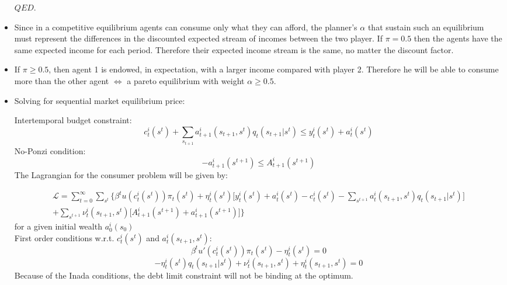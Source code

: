 \documentclass[12pt,a4paper]{article}
\begin{document}
\begin{itemize}
  $QED$.

  \item Since in a competitive equilibrium agents can consume only what they can afford, the planner's $\alpha$ that sustain such an equilibrium must represent the differences in the discounted expected stream of incomes between the two player. If $\pi = 0.5$ then the agents have the same expected income for each period. Therefore their expected income stream is the same, no matter the discount factor.

  \item If $\pi \geq 0.5$, then agent 1 is endowed, in expectation, with a larger income compared with player 2. Therefore he will be able to consume more than the other agent $\Leftrightarrow$ a pareto equilibrium with weight $\alpha \geq 0.5$.

  
 \item Solving for sequential market equilibrium price:
 
Intertemporal budget constraint: 
\begin{equation*}
    c_{t}^{i}(s^t)+\sum_{s_{t+1}}a_{t+1}^{i}(s_{t+1},s^{t})q_t(s_{t+1}|s^{t})\leq y_{t}^{i}(s^t)+a_{t}^{i}(s^t)
\end{equation*}
No-Ponzi condition: 
\begin{equation*}
    -a_{t+1}^{i}(s^{t+1}) \leq A_{t+1}^{i}(s^{t+1})
\end{equation*}
The Lagrangian for the consumer problem will be given by: 


\begin{multline*}
    \mathcal{L}=\sum_{t=0}^{\infty}\sum_{s^t}\bigg\{
    \beta^t u(c_{t}^{i}(s^t))\pi_t(s^t)+\eta_{t}^{i}(s^t)\bigg[y_{t}^{i}(s^t)+a_{t}^{i}(s^t)-c_{t}^{i}(s^t)-\sum_{s^{t+1}}a_{t}^{i}(s_{t+1},s^t)q_t(s_{t+1}|s^{t})\bigg]\\
    +\sum_{s^{t+1}}\nu_{t}^{i}(s_{t+1},s^t)\bigg[A_{t+1}^{i}(s^{t+1})+a_{t+1}^{i}(s^{t+1})\bigg]\bigg\}
\end{multline*}
for a given initial wealth $a_0^{i}(s_0)$\\

First order conditions w.r.t. $c_{t}^{i}(s^t)$ and $a_{t}^{i}(s_{t+1},s^t)$:
\begin{equation*}
    \beta^t u'(c_{t}^{i}(s^t))\pi_t(s^t)-\eta_{t}^{i}(s^t)=0
\end{equation*}
\begin{equation*}
    -\eta_{t}^{i}(s^t)q_t(s_{t+1}|s^{t})+\nu_{t}^{i}(s_{t+1},s^t)+\eta_{t}^{i}(s_{t+1},s^t)=0
\end{equation*}
Because of the Inada conditions, the debt limit constraint will not be binding at the optimum.


\end{itemize}
\end{document}
